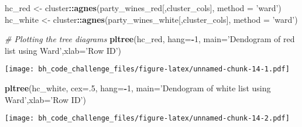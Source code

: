 \documentclass[
]{article}
\newenvironment{Shaded}{\begin{snugshade}}{\end{snugshade}}
\newcommand{\CommentTok}[1]{\textcolor[rgb]{0.56,0.35,0.01}{\textit{#1}}}
\newcommand{\DataTypeTok}[1]{\textcolor[rgb]{0.13,0.29,0.53}{#1}}
\newcommand{\DecValTok}[1]{\textcolor[rgb]{0.00,0.00,0.81}{#1}}
\newcommand{\KeywordTok}[1]{\textcolor[rgb]{0.13,0.29,0.53}{\textbf{#1}}}
\newcommand{\NormalTok}[1]{#1}
\newcommand{\OperatorTok}[1]{\textcolor[rgb]{0.81,0.36,0.00}{\textbf{#1}}}
\newcommand{\StringTok}[1]{\textcolor[rgb]{0.31,0.60,0.02}{#1}}
\begin{document}
\begin{Shaded}
\begin{Highlighting}[]
\NormalTok{hc_red <-}\StringTok{ }\NormalTok{cluster}\OperatorTok{::}\KeywordTok{agnes}\NormalTok{(party_wines_red[,cluster_cols], }\DataTypeTok{method =} \StringTok{'ward'}\NormalTok{)}
\NormalTok{hc_white <-}\StringTok{ }\NormalTok{cluster}\OperatorTok{::}\KeywordTok{agnes}\NormalTok{(party_wines_white[,cluster_cols], }\DataTypeTok{method =} \StringTok{'ward'}\NormalTok{)}

\CommentTok{# Plotting the tree diagrams}
\KeywordTok{pltree}\NormalTok{(hc_red, }\DataTypeTok{hang=}\OperatorTok{-}\DecValTok{1}\NormalTok{, }\DataTypeTok{main=}\StringTok{'Dendogram of red list using Ward'}\NormalTok{,}\DataTypeTok{xlab=}\StringTok{'Row ID'}\NormalTok{)}
\end{Highlighting}
\end{Shaded}

\texttt{[image: bh\_code\_challenge\_files/figure-latex/unnamed-chunk-14-1.pdf]}

\begin{Shaded}
\begin{Highlighting}[]
\KeywordTok{pltree}\NormalTok{(hc_white, }\DataTypeTok{cex=}\NormalTok{.}\DecValTok{5}\NormalTok{, }\DataTypeTok{hang=}\OperatorTok{-}\DecValTok{1}\NormalTok{, }\DataTypeTok{main=}\StringTok{'Dendogram of white list using Ward'}\NormalTok{,}\DataTypeTok{xlab=}\StringTok{'Row ID'}\NormalTok{)}
\end{Highlighting}
\end{Shaded}

\texttt{[image: bh\_code\_challenge\_files/figure-latex/unnamed-chunk-14-2.pdf]}

\begin{Shaded}
\end{Shaded}
\end{document}
